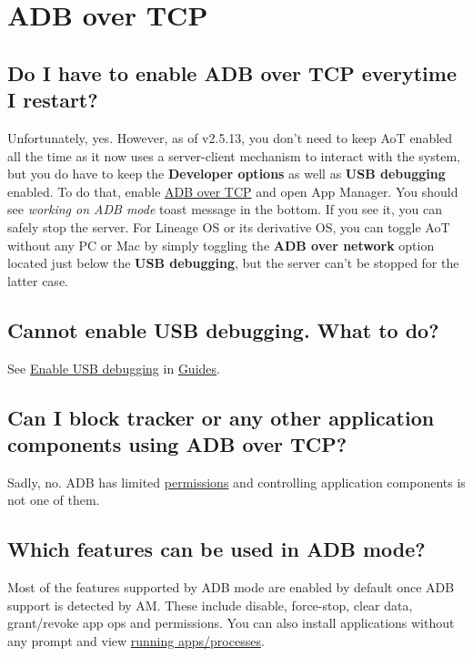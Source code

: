 \section{ADB over TCP}\label{sec:faq:adb-over-tcp}

\subsection{Do I have to enable ADB over TCP everytime I restart?}
Unfortunately, yes. However, as of v2.5.13, you don't need to keep AoT enabled all the time as it now uses a
server-client mechanism to interact with the system, but you do have to keep the \textbf{Developer options} as well as
\textbf{USB debugging} enabled. To do that, enable \hyperref[sec:adb-over-tcp]{ADB over TCP} and open App Manager. You
should see \textit{working on ADB mode} toast message in the bottom. If you see it, you can safely stop the server. For
Lineage OS or its derivative OS, you can toggle AoT without any PC or Mac by simply toggling the \textbf{ADB over
network} option located just below the \textbf{USB debugging}, but the server can't be stopped for the latter case.

\subsection{Cannot enable USB debugging. What to do?}
See \hyperref[subsec:enable-usb-debugging]{Enable USB debugging} in \hyperref[ch:guides]{Guides}.

\subsection{Can I block tracker or any other application components using ADB over TCP?}
Sadly, no. ADB has limited \href{https://github.com/aosp-mirror/platform_frameworks_base/blob/master/packages/Shell/AndroidManifest.xml}{permissions}
and controlling application components is not one of them.

\subsection{Which features can be used in ADB mode?}
Most of the features supported by ADB mode are enabled by default once ADB support is detected by AM. These include
disable, force-stop, clear data, grant/revoke app ops and permissions. You can also install applications without any
prompt and view \hyperref[subsubsec:main:running-apps]{running apps/processes}.
